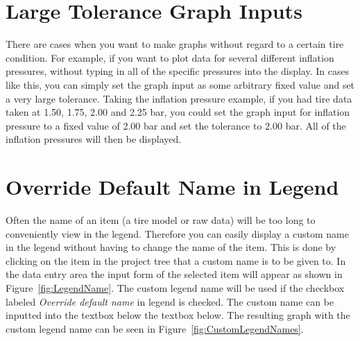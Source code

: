 \section{Large Tolerance Graph Inputs}
\label{sec:LargeToleranceGraphInputs}
There are cases when you want to make graphs without regard to a certain tire condition. For example, if you want to plot data for several different inflation pressures, without typing in all of the specific pressures into the display. In cases like this, you can simply set the graph input as some arbitrary fixed value and set a very large tolerance. Taking the inflation pressure example, if you had tire data taken at 1.50, 1.75, 2.00 and 2.25 bar, you could set the graph input for inflation pressure to a fixed value of 2.00 bar and set the tolerance to 2.00 bar. All of the inflation pressures will then be displayed.

\section{Override Default Name in Legend}
\label{sec:OverrideDefaultNameinLegend}
Often the name of an item (a tire model or raw data) will be too long to conveniently view in the legend. Therefore you can easily display a custom name in the legend without having to change the name of the item. This is done by clicking on the item in the project tree that a custom name is to be given to. In the data entry area the input form of the selected item will appear as shown in Figure~\ref{fig:LegendName}. The custom legend name will be used if the checkbox labeled \textsl{Override default name} in legend is checked. The custom name can be inputted into the textbox below the textbox below. The resulting graph with the custom legend name can be seen in Figure~\ref{fig:CustomLegendNames}.

